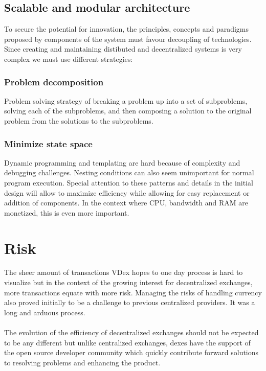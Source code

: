 \documentclass[]{article}
\begin{document}
	\subsection{Scalable and modular architecture}
	To secure the potential for innovation, the principles, 
	concepts and paradigms proposed by components of the system
	must favour decoupling of technologies. 
	Since creating and maintaining distibuted and decentralized systems
	is very complex we must use different strategies: 
	\subsubsection{Problem decomposition}
	Problem solving strategy of breaking a problem up into a set of subproblems, solving each of the subproblems, and then composing a solution to the original problem from the solutions to the subproblems.
	\subsubsection{Minimize state space}
	Dynamic programming and templating are hard because of complexity and debugging challenges. 
	Nesting conditions can also seem unimportant for normal program execution.
	Special attention to these patterns and details in the initial design will allow to maximize efficiency while allowing for easy replacement or addition of components.   
	In the context where CPU, bandwidth and RAM are monetized, this is even more important. 
	
\section{Risk}
	The sheer amount of transactions VDex hopes to one day process is hard to visualize but in the context of the growing interest for decentralized exchanges, more transactions equate with more risk. 
	Managing the risks of handling currency also proved initially to be a challenge to previous centralized providers. It was a long and arduous process.\\
	\paragraph{} The evolution of the efficiency of decentralized exchanges should not be expected to be any different but unlike centralized exchanges, dexes have the support of the open source developer community which quickly contribute forward solutions to resolving problems and enhancing the product. \\
\end{document}
